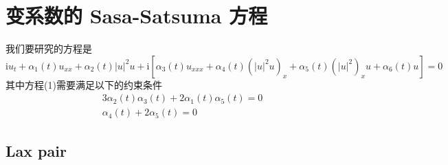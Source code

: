 \chapter{变系数的 Sasa-Satsuma 方程}


我们要研究的方程是
\begin{equation}
  \mathrm{i}u_{t} + \alpha_{1}(t)u_{xx} + \alpha_2(t)|u|^{2}u + \mathrm{i}\left[\alpha_3(t)u_{xxx} + \alpha_{4}(t)(|u|^{2}u)_{x} + \alpha_{5}(t)(|u|^{2})_{x}u + \alpha_{6}(t)u \right] = 0
\end{equation}
其中方程(1)需要满足以下的约束条件
\begin{align}
   & 3\alpha_{2}(t)\alpha_{3}(t) + 2\alpha_{1}(t)\alpha_{5}(t) = 0 \\
   & \alpha_{4}(t) + 2\alpha_{5}(t) = 0
\end{align}

\section{Lax pair}

